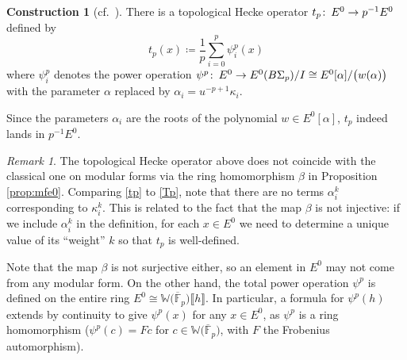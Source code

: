 \documentclass{gtpart}
\theoremstyle{definition}
\newtheorem{cstr}[thm]{Construction}
\theoremstyle{remark}
\newtheorem{rmk}[thm]{Remark}
\def\co{\colon\thinspace}
\newcommand{\mb}[1]{\mathbb{#1}}
\newcommand{\cF}{\overline {\mb F}}
\newcommand{\BW}{{\mb W}}
\newcommand{\A}{\alpha}
\newcommand{\B}{\beta}
\newcommand{\K}{\kappa}
\newcommand{\ce}{\coloneqq}
\newcommand{\lb}{\llbracket}
\newcommand{\rb}{\rrbracket}
\renewcommand{\=}{\approx}
\renewcommand{\-}{\sim}
\numberwithin{equation}{section}
\numberwithin{thm}{section}
\begin{document}
\begin{cstr}[{cf.~\cite[1.12]{log}}]
 There is a topological Hecke operator $t_p \co E^0 \to p^{-1} E^0$ defined by 
 \begin{equation}
  \label{tp}
  t_p(x) \ce \frac{1}{p} \sum_{i=0}^p \psi^p_i(x) 
 \end{equation}
 where $\psi^p_i$ denotes the power operation $\psi^p \co E^0 \to E^0(B\Sigma_p) / I \cong E^0[\A] / \big( w(\A) \big)$ with the parameter $\A$ replaced by $\A_i = u^{-p + 1} \K_i$.  
\end{cstr}
Since the parameters $\A_i$ are the roots of the polynomial $w \in E^0[\A]$, 
$t_p$ indeed lands in $p^{-1} E^0$.  
\begin{rmk}
 \label{rmk:tc}
 The topological Hecke operator above does not coincide with the classical one on modular forms via the ring homomorphism $\B$ in Proposition \ref{prop:mfe0}.  
 Comparing \eqref{tp} to \eqref{Tp}, note that there are no terms $\A_i^k$ corresponding to $\K_i^k$.  
 This is related to the fact that the map $\B$ is not injective: 
 if we include $\A_i^k$ in the definition, for each $x \in E^0$ we need to determine a unique value of its ``weight'' $k$ so that $t_p$ is well-defined.  

 Note that the map $\B$ is not surjective either, so an element in $E^0$ may not come from any modular form.  
 On the other hand, the total power operation $\psi^p$ is defined on the entire ring $E^0 \cong \BW \big( \cF_p \big) \lb h \rb$.  
 In particular, a formula for $\psi^p(h)$ extends by continuity to give $\psi^p(x)$ for any $x \in E^0$, as $\psi^p$ is a ring homomorphism 
 ($\psi^p(c) = F c$ for $c \in \BW \big( \cF_p \big)$, with $F$ the Frobenius automorphism).  
\end{rmk}
\end{document}
